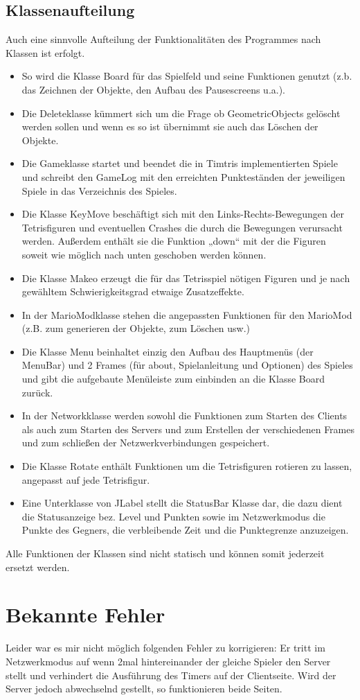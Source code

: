 \documentclass[10pt,a4paper,titlepage]{article}
\begin{document}
\subsection{Klassenaufteilung}
Auch eine sinnvolle Aufteilung der Funktionalitäten des Programmes nach Klassen ist
erfolgt.
\begin{itemize}
	\item So wird die Klasse Board für das Spielfeld und seine Funktionen genutzt (z.b. das Zeichnen
	der Objekte, den Aufbau des Pausescreens u.a.).
	\item Die Deleteklasse kümmert sich um die Frage ob GeometricObjects gelöscht werden sollen
	und wenn es so ist übernimmt sie auch das Löschen der Objekte.
	\item Die Gameklasse startet und beendet die in Timtris implementierten Spiele und schreibt
	den GameLog mit den erreichten Punkteständen der jeweiligen Spiele in das Verzeichnis
	des Spieles.
	\item Die Klasse KeyMove beschäftigt sich mit den Links-Rechts-Bewegungen der Tetrisfiguren
	und eventuellen Crashes die durch die Bewegungen verursacht werden. Außerdem enthält
	sie die Funktion „down“ mit der die Figuren soweit wie möglich nach unten geschoben
	werden können.
	\item Die Klasse Makeo erzeugt die für das Tetrisspiel nötigen Figuren und je nach gewähltem
	Schwierigkeitsgrad etwaige Zusatzeffekte.
	\item In der MarioModklasse stehen die angepassten Funktionen für den MarioMod (z.B. zum
	generieren der Objekte, zum Löschen usw.)
	\item Die Klasse Menu beinhaltet einzig den Aufbau des Hauptmenüs (der MenuBar) und 2
	Frames (für about, Spielanleitung und Optionen) des Spieles und gibt die aufgebaute
	Menüleiste zum einbinden an die Klasse Board zurück.
	\item In der Networkklasse werden sowohl die Funktionen zum Starten des Clients als auch zum
	Starten des Servers und zum Erstellen der verschiedenen Frames und zum schließen der
	Netzwerkverbindungen gespeichert.
	\item Die Klasse Rotate enthält Funktionen um die Tetrisfiguren rotieren zu lassen, angepasst auf
	jede Tetrisfigur.
	\item Eine Unterklasse von JLabel stellt die StatusBar Klasse dar, die dazu dient die Statusanzeige
	bez. Level und Punkten sowie im Netzwerkmodus die Punkte des Gegners, die verbleibende
	Zeit und die Punktegrenze anzuzeigen.
\end{itemize}
Alle Funktionen der Klassen sind nicht statisch und können somit jederzeit ersetzt werden.
\section{Bekannte Fehler}
Leider war es mir nicht möglich folgenden Fehler zu korrigieren:
Er tritt im Netzwerkmodus auf wenn 2mal hintereinander der gleiche Spieler den Server
stellt und verhindert die Ausführung des Timers auf der Clientseite.
Wird der Server jedoch abwechselnd gestellt, so funktionieren beide Seiten.
\end{document}
